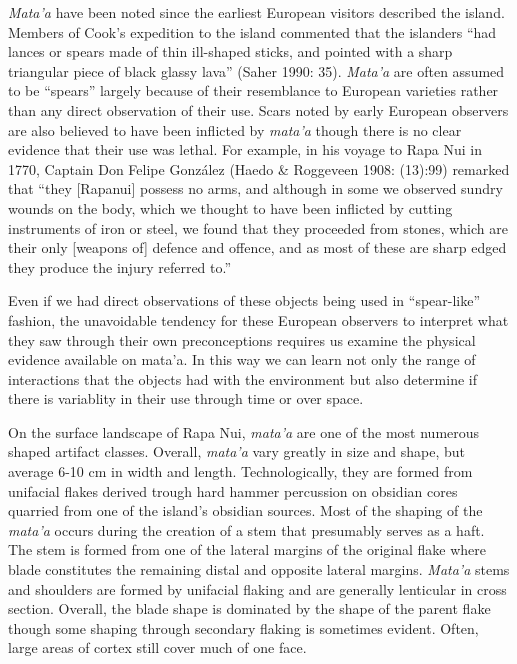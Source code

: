 \documentclass[]{article}
\begin{document}
\emph{Mata'a} have been noted since the earliest European visitors
described the island. Members of Cook's expedition to the island
commented that the islanders ``had lances or spears made of thin
ill-shaped sticks, and pointed with a sharp triangular piece of black
glassy lava'' (Saher 1990: 35). \emph{Mata'a} are often assumed to be
``spears'' largely because of their resemblance to European varieties
rather than any direct observation of their use. Scars noted by early
European observers are also believed to have been inflicted by
\emph{mata'a} though there is no clear evidence that their use was
lethal. For example, in his voyage to Rapa Nui in 1770, Captain Don
Felipe González (Haedo \& Roggeveen 1908: (13):99) remarked that ``they
{[}Rapanui{]} possess no arms, and although in some we observed sundry
wounds on the body, which we thought to have been inflicted by cutting
instruments of iron or steel, we found that they proceeded from stones,
which are their only {[}weapons of{]} defence and offence, and as most
of these are sharp edged they produce the injury referred to.''

Even if we had direct observations of these objects being used in
``spear-like'' fashion, the unavoidable tendency for these European
observers to interpret what they saw through their own preconceptions
requires us examine the physical evidence available on mata'a. In this
way we can learn not only the range of interactions that the objects had
with the environment but also determine if there is variablity in their
use through time or over space.

On the surface landscape of Rapa Nui, \emph{mata'a} are one of the most
numerous shaped artifact classes. Overall, \emph{mata'a} vary greatly in
size and shape, but average 6-10 cm in width and length.
Technologically, they are formed from unifacial flakes derived trough
hard hammer percussion on obsidian cores quarried from one of the
island's obsidian sources. Most of the shaping of the \emph{mata'a}
occurs during the creation of a stem that presumably serves as a haft.
The stem is formed from one of the lateral margins of the original flake
where blade constitutes the remaining distal and opposite lateral
margins. \emph{Mata'a} stems and shoulders are formed by unifacial
flaking and are generally lenticular in cross section. Overall, the
blade shape is dominated by the shape of the parent flake though some
shaping through secondary flaking is sometimes evident. Often, large
areas of cortex still cover much of one face.
\end{document}
